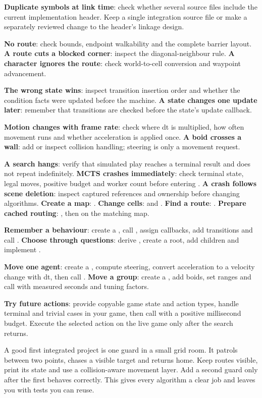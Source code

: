 \documentclass[11pt,a4paper]{article}
\begin{document}
\textbf{Duplicate symbols at link time}: check whether several source files include the current implementation header. Keep a single integration source file or make a separately reviewed change to the header's linkage design.

\textbf{No route}: check bounds, endpoint walkability and the complete barrier layout. \textbf{A route cuts a blocked corner}: inspect the diagonal-neighbour rule. \textbf{A character ignores the route}: check world-to-cell conversion and waypoint advancement.

\textbf{The wrong state wins}: inspect transition insertion order and whether the condition facts were updated before the machine. \textbf{A state changes one update later}: remember that transitions are checked before the state's update callback.

\textbf{Motion changes with frame rate}: check where dt is multiplied, how often movement runs and whether acceleration is applied once. \textbf{A boid crosses a wall}: add or inspect collision handling; steering is only a movement request.

\textbf{A search hangs}: verify that simulated play reaches a terminal result and does not repeat indefinitely. \textbf{MCTS crashes immediately}: check terminal state, legal moves, positive budget and worker count before entering . \textbf{A crash follows scene deletion}: inspect captured references and ownership before changing algorithms.
\textbf{Create a map}: . \textbf{Change cells}:  and . \textbf{Find a route}: . \textbf{Prepare cached routing}: , then  on the matching map.

\textbf{Remember a behaviour}: create a , call , assign callbacks, add transitions and call . \textbf{Choose through questions}: derive , create a root, add children and implement .

\textbf{Move one agent}: create a , compute steering, convert acceleration to a velocity change with dt, then call . \textbf{Move a group}: create a , add boids, set ranges and call  with measured seconds and tuning factors.

\textbf{Try future actions}: provide copyable game state and action types, handle terminal and trivial cases in your game, then call  with a positive millisecond budget. Execute the selected action on the live game only after the search returns.

A good first integrated project is one guard in a small grid room. It patrols between two points, chases a visible target and returns home. Keep routes visible, print its state and use a collision-aware movement layer. Add a second guard only after the first behaves correctly. This gives every algorithm a clear job and leaves you with tests you can reuse.
\end{document}
